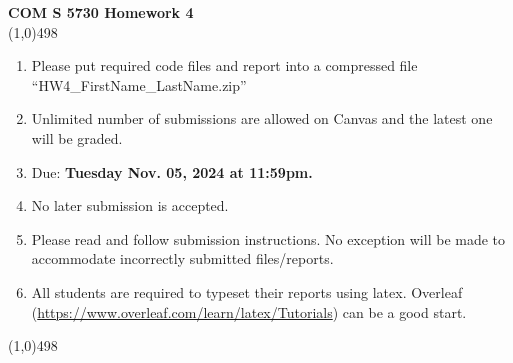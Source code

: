 \documentclass[11pt]{article}
\begin{document}
\begin{center}
    {\Large \textbf{COM S 5730 Homework 4}}\\

    \linethickness{1mm}\line(1,0){498}

    \begin{enumerate}
\item Please put required code files and report into a
compressed file ``HW4\_FirstName\_LastName.zip''
\item Unlimited number of submissions are
allowed on Canvas and the latest one will be graded.
\item Due: \textbf{Tuesday Nov. 05, 2024 at 11:59pm.}
        \item {\color{red} No later submission is accepted.}
        \item Please read and follow submission instructions. No exception
              will be made to accommodate incorrectly submitted files/reports.
        \item All students are required to typeset their reports using
              latex. Overleaf
              (\url{https://www.overleaf.com/learn/latex/Tutorials}) can be a
              good start.
    \end{enumerate}

    \linethickness{1mm}\line(1,0){498}

\end{center}


\end{document}
